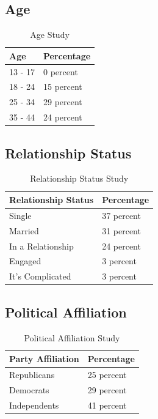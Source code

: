 \documentclass{article}
\begin{document}
\subsection*{Age}
\begin{table}[H]
\centering
\begin{tabular}{|p{2cm}||p{2cm}|} 
 \hline
 Age & Percentage \\ [0.5ex] 
 \hline\hline
 13 - 17 & 0 percent \\
 \hline
 18 - 24 & 15 percent \\
 \hline
 25 - 34 & 29 percent \\
 \hline
 35 - 44 & 24 percent \\ [1ex] 
 \hline
\end{tabular}
\caption{Age Study \cite{sproutsocialwebsite}}
\label{table:1}
\end{table}

\subsection*{Relationship Status}
\begin{table}[H]
\centering
\begin{tabular}{|p{3cm}||p{3cm}|} 
 \hline
 Relationship Status & Percentage \\ [0.5ex] 
 \hline\hline
 Single & 37 percent \\
 \hline
 Married & 31 percent \\
 \hline
 In a Relationship & 24 percent \\
 \hline
 Engaged & 3 percent \\
 \hline
 It's Complicated & 3 percent \\ [1ex] 
 \hline
\end{tabular}
\caption{Relationship Status Study \cite{relstatuswebsite}}
\label{table:2}
\end{table}

\subsection*{Political Affiliation}
\begin{table}[H]
\centering
\begin{tabular}{|p{3cm}||p{3cm}|} 
 \hline
 Party Affiliation & Percentage \\ [0.5ex] 
 \hline\hline
 Republicans & 25 percent \\
 \hline
 Democrats & 29 percent \\
 \hline
 Independents & 41 percent \\ [1ex] 
 \hline
\end{tabular}
\caption{Political Affiliation Study \cite{polstatuswebsite}}
\label{table:3}
\end{table}
\end{document}
